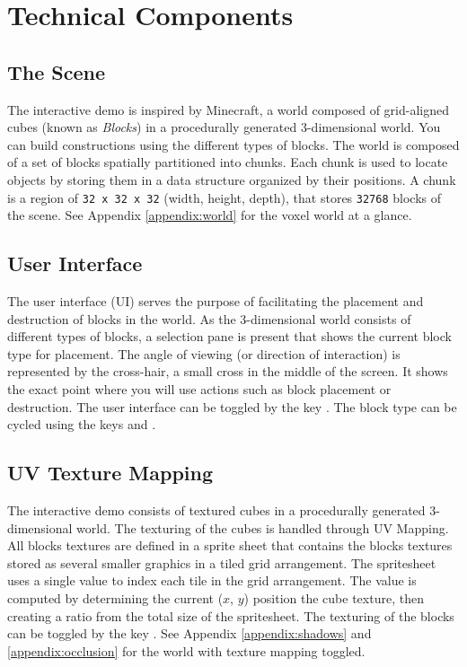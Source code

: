 \documentclass[a4paper,11pt,titlepage]{scrartcl}
\begin{document}
\section{Technical Components}
\subsection{The Scene}
The interactive demo is inspired by Minecraft, a world composed of grid-aligned cubes (known as \textit{Blocks}) in a procedurally generated 3-dimensional world.  You can build constructions using the different types of blocks.  The world is composed of a set of blocks spatially partitioned into chunks.  Each chunk is used to locate objects by storing them in a data structure organized by their positions.   A chunk is a region of \texttt{32 x 32 x 32} (width, height, depth), that stores \texttt{32768} blocks of the scene.
\vskip 2.5mm\noindent
See Appendix \ref{appendix:world} for the voxel world at a glance.
  
\subsection{User Interface}
The user interface (UI) serves the purpose of facilitating the placement and destruction of blocks in the world.  As the 3-dimensional world consists of different types of blocks, a selection pane is present that shows the current block type for placement.  The angle of viewing (or direction of interaction) is represented by the cross-hair, a small cross in the middle of the screen.  It shows the exact point where you will use actions such as block placement or destruction.
\vskip 2.5mm\noindent
The user interface can be toggled by the key .  The block type can be cycled using the keys  and .

\subsection{UV Texture Mapping}
The interactive demo consists of textured cubes in a procedurally generated 3-dimensional world.  The texturing of the cubes is handled through UV Mapping.  All blocks textures are defined in a sprite sheet that contains the blocks textures stored as several smaller graphics in a tiled grid arrangement.  The spritesheet uses a single value to index each tile in the grid arrangement.  The value is computed by determining the current ($x$, $y$) position the cube texture, then creating a ratio from the total size of the spritesheet.
\vskip 2.5mm\noindent
The texturing of the blocks can be toggled by the key .  See Appendix \ref{appendix:shadows} and \ref{appendix:occlusion} for the world with texture mapping toggled.
\end{document}
